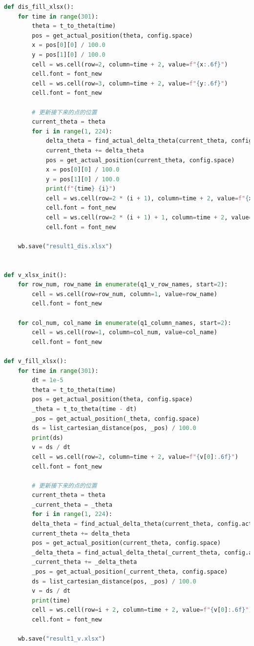 \documentclass[a4paper]{article}
\begin{document}
\begin{lstlisting}[language=python,columns=fullflexible,frame=shadowbox]
def dis_fill_xlsx():
	for time in range(301):
		theta = t_to_theta(time)
		pos = get_actual_position(theta, config.space)
		x = pos[0][0] / 100.0
		y = pos[1][0] / 100.0
		cell = ws.cell(row=2, column=time + 2, value=f"{x:.6f}")
		cell.font = font_new
		cell = ws.cell(row=3, column=time + 2, value=f"{y:.6f}")
		cell.font = font_new

		# 更新接下来的点的位置
		current_theta = theta
		for i in range(1, 224):
			delta_theta = find_actual_delta_theta(current_theta, config.actual_fixed_distances[0 if i == 1 else 1], config.space)
			current_theta += delta_theta
			pos = get_actual_position(current_theta, config.space)
			x = pos[0][0] / 100.0
			y = pos[1][0] / 100.0
			print(f"{time} {i}")
			cell = ws.cell(row=2 * (i + 1), column=time + 2, value=f"{x:.6f}")
			cell.font = font_new
			cell = ws.cell(row=2 * (i + 1) + 1, column=time + 2, value=f"{y:.6f}")
			cell.font = font_new

	wb.save("result1_dis.xlsx")


def v_xlsx_init():
	for row_num, row_name in enumerate(q1_v_row_names, start=2):
		cell = ws.cell(row=row_num, column=1, value=row_name)
		cell.font = font_new

	for col_num, col_name in enumerate(q1_column_names, start=2):
		cell = ws.cell(row=1, column=col_num, value=col_name)
		cell.font = font_new

def v_fill_xlsx():
	for time in range(301):
		dt = 1e-5
		theta = t_to_theta(time)
		pos = get_actual_position(theta, config.space)
		_theta = t_to_theta(time - dt)
		_pos = get_actual_position(_theta, config.space)
		ds = list_cartesian_distance(pos, _pos) / 100.0
		print(ds)
		v = ds / dt
		cell = ws.cell(row=2, column=time + 2, value=f"{v[0]:.6f}")
		cell.font = font_new

		# 更新接下来的点的位置
		current_theta = theta
		_current_theta = _theta
		for i in range(1, 224):
		delta_theta = find_actual_delta_theta(current_theta, config.actual_fixed_distances[0 if i == 1 else 1], config.space)
		current_theta += delta_theta
		pos = get_actual_position(current_theta, config.space)
		_delta_theta = find_actual_delta_theta(_current_theta, config.actual_fixed_distances[0 if i == 1 else 1], config.space)
		_current_theta += _delta_theta
		_pos = get_actual_position(_current_theta, config.space)
		ds = list_cartesian_distance(pos, _pos) / 100.0
		v = ds / dt
		print(time)
		cell = ws.cell(row=i + 2, column=time + 2, value=f"{v[0]:.6f}")
		cell.font = font_new
		
	wb.save("result1_v.xlsx")


\end{lstlisting}
\end{document}
